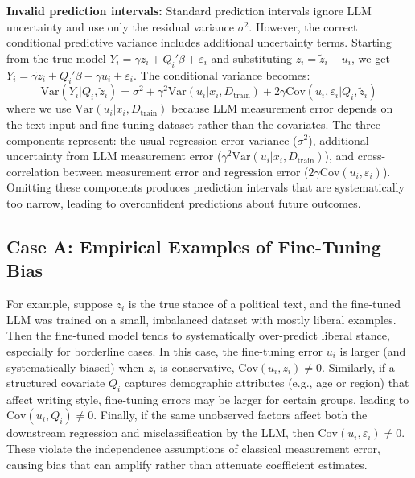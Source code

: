 \documentclass[11pt]{article}
\begin{document}
\textbf{Invalid prediction intervals:} 
Standard prediction intervals ignore LLM uncertainty and use only the residual variance $\sigma^2$. 
However, the correct conditional predictive variance includes additional uncertainty terms. 
Starting from the true model $Y_i = \gamma z_i + Q_i'\beta + \varepsilon_i$ and substituting $z_i = \tilde{z}_i - u_i$, 
we get $Y_i = \gamma\tilde{z}_i + Q_i'\beta - \gamma u_i + \varepsilon_i$. The conditional variance becomes:
\begin{equation}
\text{Var}(Y_i | Q_i, \tilde{z}_i) = \sigma^2 + \gamma^2\text{Var}(u_i | x_i, D_{\text{train}}) + 2\gamma \text{Cov}(u_i, \varepsilon_i | Q_i, \tilde{z}_i) \tag{A3}
\end{equation}
where we use $\text{Var}(u_i | x_i, D_{\text{train}})$ because LLM measurement error depends on the text input and fine-tuning dataset rather than the covariates. 
The three components represent: the usual regression error variance ($\sigma^2$), 
additional uncertainty from LLM measurement error ($\gamma^2\text{Var}(u_i | x_i, D_{\text{train}})$), 
and cross-correlation between measurement error and regression error ($2\gamma \text{Cov}(u_i, \varepsilon_i)$). 
Omitting these components produces prediction intervals that are systematically too narrow, 
leading to overconfident predictions about future outcomes.

\subsection{Case A: Empirical Examples of Fine-Tuning Bias}

For example, suppose $z_i$ is the true stance of a political text, 
and the fine-tuned LLM was trained on a small, imbalanced dataset with mostly liberal examples. 
Then the fine-tuned model tends to systematically over-predict liberal stance, especially for borderline cases. 
In this case, the fine-tuning error $u_i$ is larger (and systematically biased) when $z_i$ is conservative, 
$\text{Cov}(u_i, z_i) \neq 0$. Similarly, if a structured covariate $Q_i$ captures demographic attributes 
(e.g., age or region) that affect writing style, fine-tuning errors may be larger for certain groups,
leading to $\text{Cov}(u_i, Q_i) \neq 0$.
Finally, if the same unobserved factors affect both the downstream regression and misclassification by the LLM, 
then $\text{Cov}(u_i, \varepsilon_i) \neq 0$.
These violate the independence assumptions of classical measurement error, 
causing bias that can amplify rather than attenuate coefficient estimates.
\end{document}
